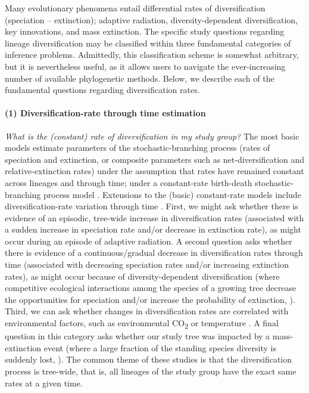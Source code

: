 Many evolutionary phenomena entail differential rates of diversification (speciation -- extinction); \EG adaptive radiation, diversity-dependent diversification, key innovations, and mass extinction.
The specific study questions regarding lineage diversification may be classified within three fundamental categories of inference problems.
Admittedly, this classification scheme is somewhat arbitrary, but it is nevertheless useful, as it allows users to navigate the ever-increasing number of available phylogenetic methods.
Below, we describe each of the fundamental questions regarding diversification rates.

\paragraph{(1) Diversification-rate through time estimation}\textit{What is the (constant) rate of diversification in my study group?} 
The most basic models estimate parameters of the stochastic-branching process (\IE rates of speciation and extinction, or composite parameters such as net-diversification and relative-extinction rates) under the assumption that rates have remained constant across lineages and through time; \IE under a constant-rate birth-death stochastic-branching process model \citep{Nee1994b}.
Extensions to the (basic) constant-rate models include diversification-rate variation through time \citep{Stadler2011,Hoehna2015a}.
First, we might ask whether there is evidence of an episodic, tree-wide increase in diversification rates (associated with a sudden increase in speciation rate and/or decrease in extinction rate), as might occur during an episode of adaptive radiation.
A second question asks whether there is evidence of a continuous/gradual decrease in diversification rates through time (associated with decreasing speciation rates and/or increasing extinction rates), as might occur because of diversity-dependent diversification (\IE where competitive ecological interactions among the species of a growing tree decrease the opportunities for speciation and/or increase the probability of extinction, \EG \cite{Hoehna2014a}).
Third, we can ask whether changes in diversification rates are correlated with environmental factors, such as environmental CO\textsubscript{2} or temperature \citep{Condamine2013}.
A final question in this category asks whether our study tree was impacted by a mass-extinction event (where a large fraction of the standing species diversity is suddenly lost, \EG \cite{May2016}).
The common theme of these studies is that the diversification process is tree-wide, that is, all lineages of the study group have the exact same rates at a given time.



